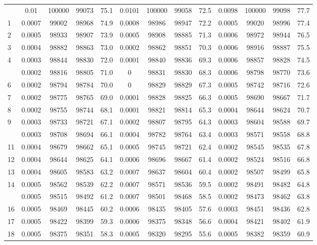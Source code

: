 \documentclass[
  14pt,
]{article}
\begin{document}
\begin{longtable}[t]{lcccccccccccc}
\endfoot
\bottomrule
\endlastfoot
0 & 0.01 & 100000 & 99073 & 75.1 & 0.0101 & 100000 & 99058 & 72.5 & 0.0098 & 100000 & 99098 & 77.7\\
1 & 0.0007 & 99002 & 98968 & 74.9 & 0.0008 & 98986 & 98947 & 72.2 & 0.0005 & 99020 & 98996 & 77.4\\
2 & 0.0005 & 98933 & 98907 & 73.9 & 0.0005 & 98908 & 98885 & 71.3 & 0.0006 & 98972 & 98944 & 76.5\\
3 & 0.0004 & 98882 & 98863 & 73.0 & 0.0002 & 98862 & 98851 & 70.3 & 0.0006 & 98916 & 98887 & 75.5\\
4 & 0.0003 & 98844 & 98830 & 72.0 & 0.0001 & 98840 & 98836 & 69.3 & 0.0006 & 98857 & 98828 & 74.5\\
\addlinespace
5 & 0.0002 & 98816 & 98805 & 71.0 & 0 & 98831 & 98830 & 68.3 & 0.0006 & 98798 & 98770 & 73.6\\
6 & 0.0002 & 98794 & 98784 & 70.0 & 0 & 98829 & 98829 & 67.3 & 0.0005 & 98742 & 98716 & 72.6\\
7 & 0.0002 & 98775 & 98765 & 69.0 & 0.0001 & 98828 & 98825 & 66.3 & 0.0005 & 98690 & 98667 & 71.7\\
8 & 0.0002 & 98755 & 98744 & 68.1 & 0.0001 & 98821 & 98814 & 65.3 & 0.0004 & 98644 & 98624 & 70.7\\
9 & 0.0003 & 98733 & 98721 & 67.1 & 0.0002 & 98807 & 98795 & 64.3 & 0.0003 & 98604 & 98588 & 69.7\\
\addlinespace
10 & 0.0003 & 98708 & 98694 & 66.1 & 0.0004 & 98782 & 98764 & 63.4 & 0.0003 & 98571 & 98558 & 68.8\\
11 & 0.0004 & 98679 & 98662 & 65.1 & 0.0005 & 98745 & 98721 & 62.4 & 0.0002 & 98545 & 98535 & 67.8\\
12 & 0.0004 & 98644 & 98625 & 64.1 & 0.0006 & 98696 & 98667 & 61.4 & 0.0002 & 98524 & 98516 & 66.8\\
13 & 0.0004 & 98605 & 98583 & 63.2 & 0.0007 & 98637 & 98604 & 60.4 & 0.0002 & 98507 & 98499 & 65.8\\
14 & 0.0005 & 98562 & 98539 & 62.2 & 0.0007 & 98571 & 98536 & 59.5 & 0.0002 & 98491 & 98482 & 64.8\\
\addlinespace
15 & 0.0005 & 98515 & 98492 & 61.2 & 0.0007 & 98501 & 98468 & 58.5 & 0.0002 & 98473 & 98462 & 63.8\\
16 & 0.0005 & 98469 & 98445 & 60.2 & 0.0006 & 98435 & 98405 & 57.6 & 0.0003 & 98451 & 98436 & 62.8\\
17 & 0.0005 & 98422 & 98399 & 59.3 & 0.0006 & 98375 & 98348 & 56.6 & 0.0004 & 98421 & 98402 & 61.9\\
18 & 0.0005 & 98375 & 98351 & 58.3 & 0.0005 & 98320 & 98295 & 55.6 & 0.0005 & 98382 & 98359 & 60.9\\

\end{longtable}
\end{document}
